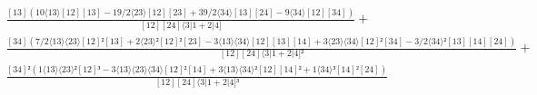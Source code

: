 \documentclass[varwidth, border=5pt]{standalone}
\begin{document}
\begin{my}
$\begin{gathered}
\scriptscriptstyle\frac{[13](10⟨13⟩[12][13]-19/2⟨23⟩[12][23]+39/2⟨34⟩[13][24]-9⟨34⟩[12][34])}{[12][24]⟨3|1+2|4]} +\\
\scriptscriptstyle\frac{[34](7/2⟨13⟩⟨23⟩[12]²[13]+2⟨23⟩²[12]²[23]-3⟨13⟩⟨34⟩[12][13][14]+3⟨23⟩⟨34⟩[12]²[34]-3/2⟨34⟩²[13][14][24])}{[12][24]⟨3|1+2|4]²} +\\
\scriptscriptstyle\frac{[34]²(1⟨13⟩⟨23⟩²[12]³-3⟨13⟩⟨23⟩⟨34⟩[12]²[14]+3⟨13⟩⟨34⟩²[12][14]²+1⟨34⟩³[14]²[24])}{[12][24]⟨3|1+2|4]³} \phantom{+}
\end{gathered}$
\end{my}
\end{document}
